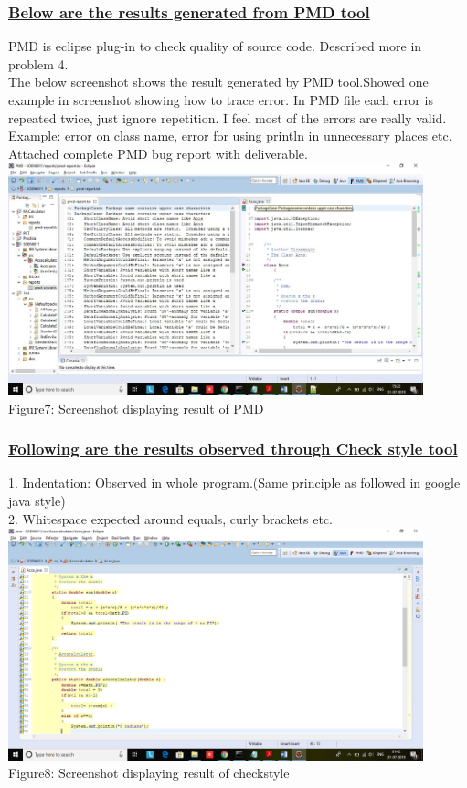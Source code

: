 \documentclass[a4paper,12pt]{article}
\begin{document}
\begin{titlepage}
\subsubsection{\underline{\textbf{Below are the results generated from PMD tool}}}
PMD is eclipse plug-in to check quality of source code. Described more in problem 4.\\
The below screenshot shows the result generated by PMD tool.Showed one example in screenshot showing how to trace error. In PMD file each error is repeated twice, just ignore repetition. I feel most of the errors are really valid. Example: error on class name, error for using println in unnecessary places etc. Attached complete PMD bug report with deliverable.\\
\newline
\includegraphics[width=12.0cm]{F7.jpg}\\
Figure7: Screenshot displaying result of PMD \\
\subsubsection{\underline{\textbf{Following are the results observed through Check style tool}}}
1.	Indentation: Observed in whole program.(Same principle as followed in google java style)\\
2.	Whitespace expected around equals, curly brackets etc.\\
\newline
\includegraphics[width=12.0cm]{F8.png}\\
Figure8: Screenshot displaying result of checkstyle \\


\end{titlepage}
\end{document}
